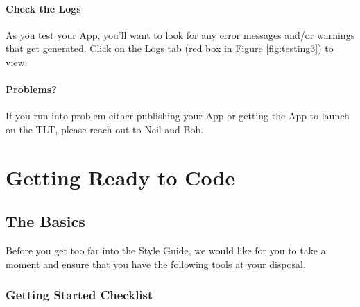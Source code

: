 \documentclass[
]{book}
\begin{document}
\hypertarget{check-the-logs}{%
\subsection{Check the Logs}\label{check-the-logs}}

As you test your App, you'll want to look for any error messages and/or warnings that get generated. Click on the Logs tab (red box in \protect\hyperlink{fig:testing3}{Figure \ref{fig:testing3}}) to view.

\hypertarget{problems}{%
\subsection{Problems?}\label{problems}}

If you run into problem either publishing your App or getting the App to launch on the TLT, please reach out to Neil and Bob.

\hypertarget{part-getting-ready-to-code}{%
\part{Getting Ready to Code}\label{part-getting-ready-to-code}}

\hypertarget{basics}{%
\chapter{The Basics}\label{basics}}

Before you get too far into the Style Guide, we would like for you to take a moment and ensure that you have the following tools at your disposal.

\hypertarget{checklist}{%
\section{Getting Started Checklist}\label{checklist}}
\end{document}
